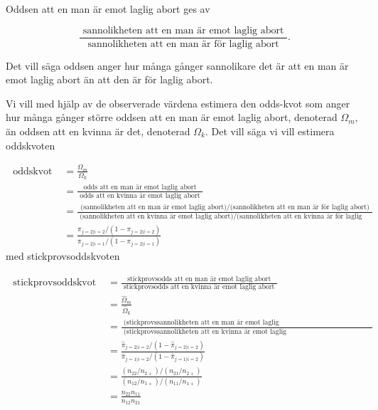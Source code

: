 \documentclass[]{article}
\begin{document}
Oddsen att en man är emot laglig abort ges av

\[
\frac{
\text{ sannolikheten att en man är emot laglig abort }
}{
\text{ sannolikheten att en man är för laglig abort }
}.
\]

Det vill säga oddsen anger hur många gånger sannolikare det är att en
man är emot laglig abort än att den är för laglig abort.

Vi vill med hjälp av de observerade värdena estimera den odds-kvot som
anger hur många gånger större oddsen att en man är emot laglig abort,
denoterad \(\Omega_{m}\), än oddsen att en kvinna är det, denoterad
\(\Omega_{k}\). Det vill säga vi vill estimera oddskvoten

\[ \begin{aligned} 
\text{ oddskvot } &= \frac{\Omega_{m}}{\Omega_{k}} \\ 
&= \frac{\text{ odds att en man är emot laglig abort }}{ \text{ odds att en kvinna är emot laglig abort }}\\ 
&= \frac{\text{ (sannolikheten att en man är emot laglig abort)/(sannolikheten att en man är för laglig abort) }}{ \text{ (sannolikheten att en kvinna är emot laglig abort)/(sannolikheten att en kvinna är för laglig abort) }}\\
&= \frac{\pi_{j = 2| i = 2}/(1-\pi_{j = 2| i = 2})}{\pi_{j = 2 | i = 1}/(1-\pi_{j = 2 | i = 1})}
\end{aligned}\] med stickprovsoddskvoten

\[ \begin{aligned} 
\text{ stickprovsoddskvot } &= \frac{\text{ stickprovsodds att en man är emot laglig abort }}{ \text{ stickprovsodds att en kvinna är emot laglig abort }}\\ &=\frac{\widehat{\Omega}_{m}}{\widehat{\Omega}_{k}}\\
&= \frac{\text{ (stickprovssannolikheten att en man är emot laglig abort)/(stickprovssannolikheten att en man är för laglig abort) }}{ \text{ (stickprovssannolikheten att en kvinna är emot laglig abort)/(stickprovssannolikheten att en kvinna är för laglig abort) }}\\
&= \frac{\widehat{\pi}_{j = 2| i = 2}/(1-\widehat{\pi}_{j = 2| i = 2})}{\widehat{\pi}_{j = 1 | i = 2}/(1-\widehat{\pi}_{j = 1 | i = 2})}\\
&= \frac{(n_{22}/n_{2+})/(n_{21}/n_{2+})}{(n_{12}/n_{1+})/(n_{11}/n_{1+})}\\
&= \frac{n_{22}n_{11}}{n_{12}n_{21}}
\end{aligned}\]
\end{document}
